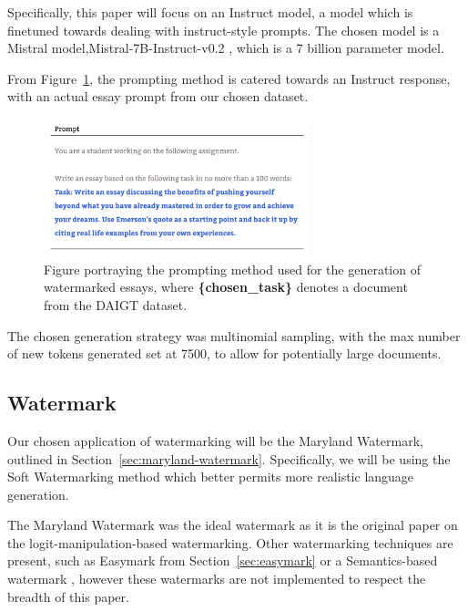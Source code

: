 \documentclass{l4proj}
\theoremstyle{definition}
\newcommand{\codefont}[1]{{\fontfamily{qcr}\selectfont #1}}
\begin{document}
        Specifically, this paper will focus on an Instruct model, a model which is finetuned towards dealing with instruct-style prompts. The chosen model is a Mistral model,\codefont{Mistral-7B-Instruct-v0.2} \citep{jiang2023mistral}, which is a 7 billion parameter model.

        From Figure~\ref{fig:prompting-method}, the prompting method is catered towards an Instruct response, with an actual essay prompt from our chosen dataset.
        
        \begin{figure}[h]
            \centering
            \includegraphics[height=4cm, width=1\linewidth, keepaspectratio]{images/methods/prompt-template.pdf}
            \caption{Figure portraying the prompting method used for the generation of watermarked essays, where \textbf{\{chosen\_task\}} denotes a document from the DAIGT dataset.}
            \label{fig:prompting-method}
        \end{figure}

        The chosen generation strategy was multinomial sampling, with the max number of new tokens generated set at 7500, to allow for potentially large documents.
        
    \subsection{Watermark}    
        \label{sec:watermark-implementation}
        Our chosen application of watermarking will be the Maryland Watermark, outlined in Section~\ref{sec:maryland-watermark}. Specifically, we will be using the Soft Watermarking method which better permits more realistic language generation. 

        The Maryland Watermark was the ideal watermark as it is the original paper on the logit-manipulation-based watermarking. Other watermarking techniques are present, such as Easymark from Section~\ref{sec:easymark} or a Semantics-based watermark \citep{hou2024ksemstamp}, however these watermarks are not implemented to respect the breadth of this paper. 
\end{document}

